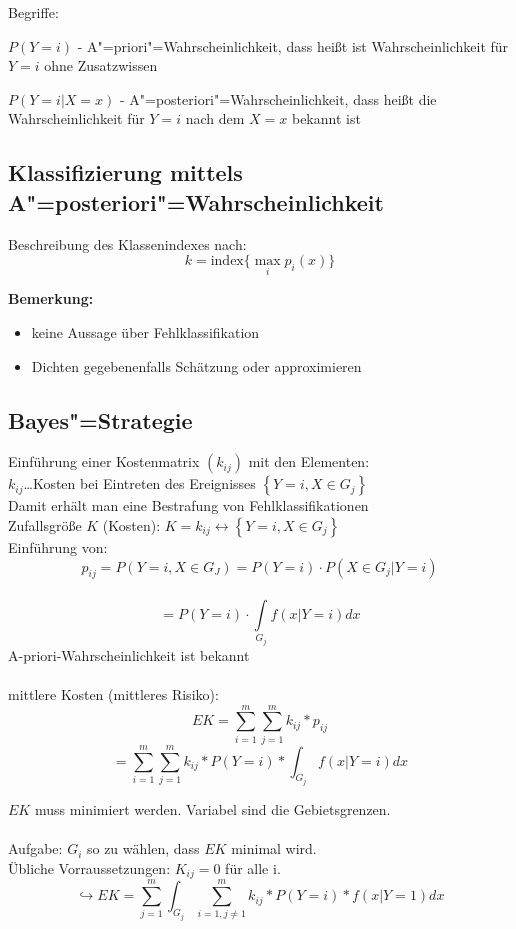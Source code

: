 \documentclass[a4paper,12pt]{scrreprt}
\newcommand{\Nb}[1]{\textbf{#1}}
\begin{document}
Begriffe:
\begin{description}
	\item{$P(Y=i)$} - A"=priori"=Wahrscheinlichkeit, dass heißt
		ist Wahrscheinlichkeit für $Y=i$ ohne Zusatzwissen
	\item{$P(Y=i|X=x)$} - A"=posteriori"=Wahrscheinlichkeit, dass heißt
		die Wahrscheinlichkeit für $Y=i$ nach dem $X=x$ bekannt ist
\end{description}

\subsection{Klassifizierung mittels A"=posteriori"=Wahrscheinlichkeit}
Beschreibung des Klassenindexes nach:
$$k=\text{index}\{\max\limits_{i}p_i(x)\}$$

\Nb{Bemerkung:} \begin{itemize}
	\item keine Aussage über Fehlklassifikation
	\item Dichten gegebenenfalls Schätzung oder approximieren 
\end{itemize}

\subsection{Bayes"=Strategie}

Einführung einer Kostenmatrix $(k_{ij})$ mit den Elementen:\\
$k_{ij}$\dots Kosten bei Eintreten des Ereignisses $\left\{ Y=i, X\in G_j
\right\}$\\
Damit erhält man eine Bestrafung von Fehlklassifikationen\\
Zufallsgröße $K$ (Kosten): $K=k_{ij}\leftrightarrow \left\{ Y=i, X\in
	G_j\right\}$\\
Einführung von:\\
$$p_{ij}= P(Y=i, X\in G_J)=P(Y=i)\cdot P(X\in G_j|Y=i)$$\\
$$=P(Y=i)\cdot\int\limits_{G_j}f(x|Y=i)dx$$
A-priori-Wahrscheinlichkeit ist bekannt\\
\\
mittlere Kosten (mittleres Risiko):\\
$$ EK = \sum_{i=1}^{m} \sum_{j=1}^{m} k_{ij} * p_{ij} $$
$$ = \sum_{i=1}^{m} \sum_{j=1}^{m} k_{ij} * P(Y=i) * \int_{G_j} f(x|Y=i) dx $$ 

$EK$ muss minimiert werden. Variabel sind die Gebietsgrenzen.\\
\\
Aufgabe: $G_i$ so zu wählen, dass $EK$ minimal wird.\\
Übliche Vorraussetzungen: $K_{ij}=0$ für alle i.\\
$$\hookrightarrow EK = \sum_{j=1}^{m} \int_{G_j} \sum_{i=1, j \neq 1}^{m} k_{ij} * P (Y=i) * f(x|Y=1)dx$$
\end{document}
